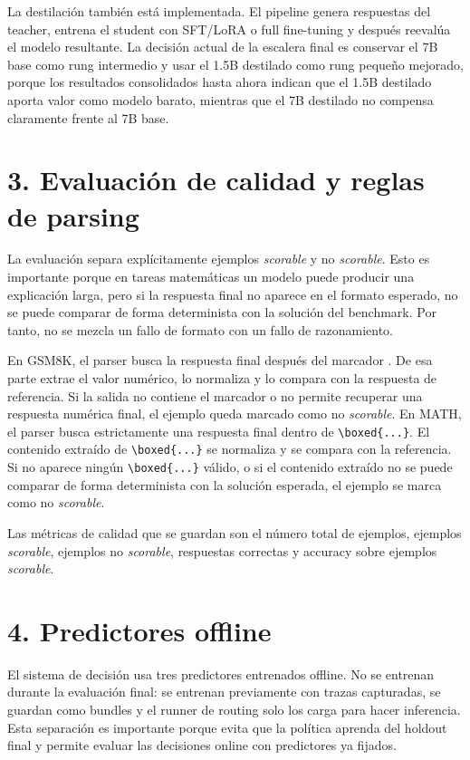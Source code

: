 \documentclass[9pt,a4paper]{article}
\newcommand{\code}[1]{\texttt{\detokenize{#1}}}
\begin{document}
La destilación también está implementada. El pipeline genera respuestas del teacher, entrena el student con SFT/LoRA o full fine-tuning y después reevalúa el modelo resultante. La decisión actual de la escalera final es conservar el 7B base como rung intermedio y usar el 1.5B destilado como rung pequeño mejorado, porque los resultados consolidados hasta ahora indican que el 1.5B destilado aporta valor como modelo barato, mientras que el 7B destilado no compensa claramente frente al 7B base.

\section*{3. Evaluación de calidad y reglas de parsing}

La evaluación separa explícitamente ejemplos \textit{scorable} y no \textit{scorable}. Esto es importante porque en tareas matemáticas un modelo puede producir una explicación larga, pero si la respuesta final no aparece en el formato esperado, no se puede comparar de forma determinista con la solución del benchmark. Por tanto, no se mezcla un fallo de formato con un fallo de razonamiento.

En GSM8K, el parser busca la respuesta final después del marcador \code{####}. De esa parte extrae el valor numérico, lo normaliza y lo compara con la respuesta de referencia. Si la salida no contiene el marcador o no permite recuperar una respuesta numérica final, el ejemplo queda marcado como no \textit{scorable}. En MATH, el parser busca estrictamente una respuesta final dentro de \verb|\boxed{...}|. El contenido extraído de \verb|\boxed{...}| se normaliza y se compara con la referencia. Si no aparece ningún \verb|\boxed{...}| válido, o si el contenido extraído no se puede comparar de forma determinista con la solución esperada, el ejemplo se marca como no \textit{scorable}.

Las métricas de calidad que se guardan son el número total de ejemplos, ejemplos \textit{scorable}, ejemplos no \textit{scorable}, respuestas correctas y accuracy sobre ejemplos \textit{scorable}.

\section*{4. Predictores offline}

El sistema de decisión usa tres predictores entrenados offline. No se entrenan durante la evaluación final: se entrenan previamente con trazas capturadas, se guardan como bundles \code{.joblib} y el runner de routing solo los carga para hacer inferencia. Esta separación es importante porque evita que la política aprenda del holdout final y permite evaluar las decisiones online con predictores ya fijados.
\end{document}
